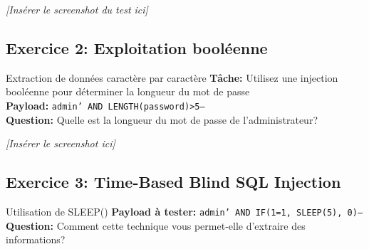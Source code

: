 \documentclass[12pt,a4paper]{article}
\begin{document}
\begin{answerbox}
\vspace{7cm}
\end{answerbox}

\begin{screenshotbox}
\centering
\textit{[Insérer le screenshot du test ici]}
\end{screenshotbox}

\subsection{Exercice 2: Exploitation booléenne}

\begin{exercicebox}{Extraction de données caractère par caractère}
\textbf{Tâche:} Utilisez une injection booléenne pour déterminer la longueur du mot de passe\\
\textbf{Payload:} \texttt{admin' AND LENGTH(password)>5--}\\
\textbf{Question:} Quelle est la longueur du mot de passe de l'administrateur?
\end{exercicebox}

\begin{answerbox}
\vspace{7cm}
\end{answerbox}

\begin{screenshotbox}
\centering
\textit{[Insérer le screenshot ici]}
\end{screenshotbox}

\subsection{Exercice 3: Time-Based Blind SQL Injection}

\begin{exercicebox}{Utilisation de SLEEP()}
\textbf{Payload à tester:} \texttt{admin' AND IF(1=1, SLEEP(5), 0)--}\\
\textbf{Question:} Comment cette technique vous permet-elle d'extraire des informations?
\end{exercicebox}

\begin{answerbox}
\vspace{7cm}
\end{answerbox}
\end{document}
